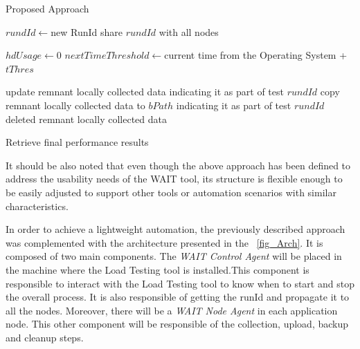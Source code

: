 \documentclass[runningheads,a4paper]{llncs}
\begin{document}
\begin{algorithm}
\caption{Proposed Approach}
\label{Proposed_Approach}
\DontPrintSemicolon
{}
\;
$rundId \gets $new RunId\;
share $rundId$ \hspace{2 mm} with all nodes\;
 {	
	$hdUsage \gets 0$\;
	$nextTimeThreshold \gets $current time from the Operating System + $tThres$\;
			
    \;
	
	\;
	update remnant locally collected data indicating it as part of test $rundId$\;
	 {
		copy remnant locally collected data to $bPath$ indicating it as part of test
		$rundId$\; }
		deleted remnant locally collected data\;
  }
  Retrieve final performance results\;

\end{algorithm}

It should be also noted that even though the above approach has been defined to
address the usability needs of the WAIT tool, its structure is flexible
enough to be easily adjusted to support other tools or automation scenarios with
similar characteristics.

In order to achieve a lightweight automation, the previously described approach
was complemented with the architecture presented in the \figurename
~\ref{fig_Arch}. It is composed of two main components. The \emph{WAIT Control
Agent} will be placed in the machine where the Load Testing tool is
installed.This component is responsible to interact with the Load Testing tool to know
when to start and stop the overall process. It is also responsible of getting 
the runId and propagate it to all the nodes. Moreover, there will be a \emph{WAIT Node Agent} 
in each application node. This other component will be responsible of the
collection, upload, backup and cleanup steps.
\end{document}
